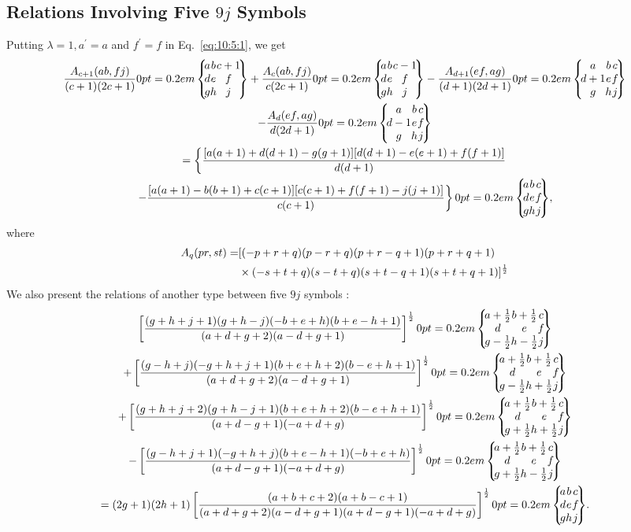 \subsection{Relations Involving Five $9 j$ Symbols \cite{ref045}}\label{sec:10.5.3}
Putting $\lambda=1, a^{\prime}=a$ and $f^{\prime}=f$ in Eq.~\eqref{eq:10:5:1}, we get
\begin{gather}
\frac{A_{c+1}(a b, f j)}{(c+1)(2 c+1)}\ninej{a}{b}{c+1}{d}{e}{f}{g}{h}{j}+\frac{A_{c}(a b, f j)}{c(2 c+1)}\ninej{a}{b}{c-1}{d}{e}{f}{g}{h}{j}-\frac{A_{d+1}(e f, a g)}{(d+1)(2 d+1)}\ninej{a}{b}{c}{d+1}{e}{f}{g}{h}{j}  \notag\\
-\frac{A_{d}(e f, a g)}{d(2 d+1)}\ninej{a}{b}{c}{d-1}{e}{f}{g}{h}{j}  \notag\\
=\left\{\frac{[a(a+1)+d(d+1)-g(g+1)][d(d+1)-e(e+1)+f(f+1)]}{d(d+1)}\right.  \notag\\
\left.-\frac{[a(a+1)-b(b+1)+c(c+1)][c(c+1)+f(f+1)-j(j+1)]}{c(c+1)}\right\}\ninej{a}{b}{c}{d}{e}{f}{g}{h}{j}, \label{eq:10:5:5}
\end{gather}
where
\begin{align}
A_{q}(p r, s t)= & {[(-p+r+q)(p-r+q)(p+r-q+1)(p+r+q+1)}  \notag\\
& \times(-s+t+q)(s-t+q)(s+t-q+1)(s+t+q+1)]^{\frac{1}{2}} \label{eq:10:5:6}
\end{align}
We also present the relations of another type between five $9 j$ symbols \cite{ref075}:
\begin{gather}
{\left[\frac{(g+h+j+1)(g+h-j)(-b+e+h)(b+e-h+1)}{(a+d+g+2)(a-d+g+1)}\right]^{\frac{1}{2}}\ninej{a+\frac{1}{2}}{b+\frac{1}{2}}{c}{d}{e}{f}{g-\frac{1}{2}}{h-\frac{1}{2}}{j}}  \notag\\
+\left[\frac{(g-h+j)(-g+h+j+1)(b+e+h+2)(b-e+h+1)}{(a+d+g+2)(a-d+g+1)}\right]^{\frac{1}{2}}\ninej{a+\frac{1}{2}}{b+\frac{1}{2}}{c}{d}{e}{f}{g-\frac{1}{2}}{h+\frac{1}{2}}{j}  \notag\\
+\left[\frac{(g+h+j+2)(g+h-j+1)(b+e+h+2)(b-e+h+1)}{(a+d-g+1)(-a+d+g)}\right]^{\frac{1}{2}}\ninej{a+\frac{1}{2}}{b+\frac{1}{2}}{c}{d}{e}{f}{g+\frac{1}{2}}{h+\frac{1}{2}}{j}  \notag\\
-\left[\frac{(g-h+j+1)(-g+h+j)(b+e-h+1)(-b+e+h)}{(a+d-g+1)(-a+d+g)}\right]^{\frac{1}{2}}\ninej{a+\frac{1}{2}}{b+\frac{1}{2}}{c}{d}{e}{f}{g+\frac{1}{2}}{h-\frac{1}{2}}{j}  \notag\\
=(2 g+1)(2 h+1)\left[\frac{(a+b+c+2)(a+b-c+1)}{(a+d+g+2)(a-d+g+1)(a+d-g+1)(-a+d+g)}\right]^{\frac{1}{2}}\ninej{a}{b}{c}{d}{e}{f}{g}{h}{j} . \label{eq:10:5:7}
\end{gather}
